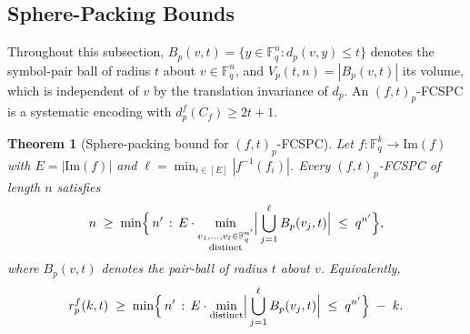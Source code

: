 \documentclass[11pt,draftclsnofoot,journal,onecolumn]{IEEEtran}
\newtheorem{theorem}{Theorem}
\begin{document}

    \subsection{Sphere-Packing Bounds}
    \label{sec:sphere}

    Throughout this subsection, $B_p(v,t) = \{y \in \mathbb{F}_q^{n} : d_p(v,y) \le t\}$ denotes the symbol-pair ball of radius $t$ about $v \in \mathbb{F}_q^{n}$, and $V_p(t,n) = |B_p(v,t)|$ its volume, which is independent of $v$ by the translation invariance of $d_p$. An $(f,t)_p$-FCSPC is a systematic encoding with $d_p^f(C_f) \ge 2t+1$.

    \begin{theorem}[Sphere-packing bound for $(f,t)_p$-FCSPC]
    \label{thm:sphere-pack-fcspc}
    Let $f : \mathbb{F}_q^k \to \mathrm{Im}(f)$ with $E = |\mathrm{Im}(f)|$ and $\ell = \min_{i \in [E]} |f^{-1}(f_i)|$. Every $(f,t)_p$-FCSPC of length $n$ satisfies
    \[
    n \;\ge\; \min\Bigl\{\, n' \,:\,
    E \cdot \min_{\substack{v_1, \dots, v_\ell \in \mathbb{F}_q^{n'}\\
    \mathrm{distinct}}}
    \Bigl|\,\bigcup_{j=1}^{\ell} B_p(v_j, t)\Bigr|
    \;\le\; q^{n'} \Bigr\},
    \]
    where $B_p(v,t)$ denotes the pair-ball of radius $t$ about $v$. Equivalently,
    \[
    r_p^f(k, t) \;\ge\; \min\Bigl\{\, n' \,:\,
    E \cdot \min_{\mathrm{distinct}}
    \Bigl|\,\bigcup_{j=1}^{\ell} B_p(v_j, t)\Bigr|
    \;\le\; q^{n'} \Bigr\} \;-\; k.
    \]
    \end{theorem}
\end{document}
